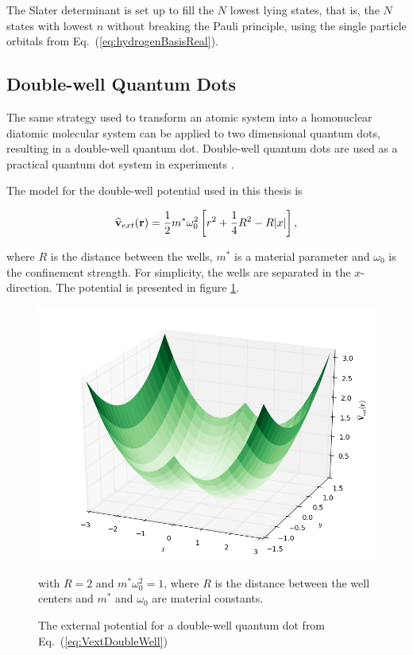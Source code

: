 The Slater determinant is set up to fill the $N$ lowest lying states, that is, the $N$ states with lowest $n$ without breaking the Pauli principle, using the single particle orbitals from Eq.~(\ref{eq:hydrogenBasisReal}).


\subsection{Double-well Quantum Dots}

The same strategy used to transform an atomic system into a homonuclear diatomic molecular system can be applied to two dimensional quantum dots, resulting in a double-well quantum dot. Double-well quantum dots are used as a practical quantum dot system in experiments \cite{doubleWellExpt}. 

The model for the double-well potential used in this thesis is \cite{ymwang}

\begin{equation}
 {\bf\widehat{v}}_{ext}(\mathbf{r}) = \frac{1}{2}m^\ast \omega_0^2 \left[r^2 + \frac{1}{4}R^2 - R|x|\right], \label{eq:VextDoubleWell}
\end{equation}

where $R$ is the distance between the wells, $m^\ast$ is a material parameter and $\omega_0$ is the confinement strength. For simplicity, the wells are separated in the $x$-direction. The potential is presented in figure \ref{fig:extPotDoubleWell}.

\begin{figure}
 \begin{center}
  \includegraphics[scale=0.5]{../Graphics/Potentials/doubleWell.png}
  \caption{The external potential for a double-well quantum dot from Eq.~(\ref{eq:VextDoubleWell})} with $R=2$ and $m^\ast\omega_0^2 = 1$, where $R$ is the distance between the well centers and $m^\ast$ and $\omega_0$ are material constants.  
  \label{fig:extPotDoubleWell}
 \end{center}
\end{figure}

